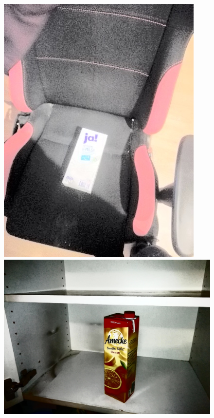 \begin{appendices}
\begin{figure}[htb]
\begin{minipage}{0.19\textwidth}
\includegraphics[width=\textwidth]{images/anomalien/HA/image67.jpg}
\end{minipage}
\begin{minipage}{0.19\textwidth}
\includegraphics[width=\textwidth]{images/anomalien/HA/image104.jpg}

\end{minipage}
\end{figure}
\end{appendices}
